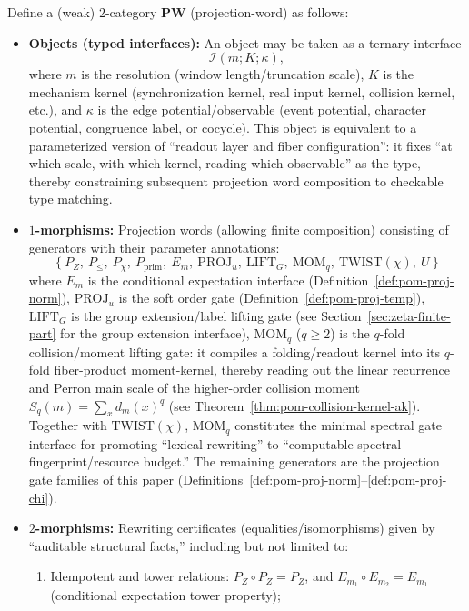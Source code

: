 \begin{definition}\label{def:pom-projword-2cat}
Define a (weak) $2$-category $\mathbf{PW}$ (projection-word) as follows:
\begin{itemize}
  \item \textbf{Objects (typed interfaces):} An object may be taken as a ternary interface
  \[
  \mathcal{I}(m;K;\kappa),
  \]
  where $m$ is the resolution (window length/truncation scale), $K$ is the mechanism kernel (synchronization kernel, real input kernel, collision kernel, etc.), and $\kappa$ is the edge potential/observable (event potential, character potential, congruence label, or cocycle). This object is equivalent to a parameterized version of ``readout layer and fiber configuration'': it fixes ``at which scale, with which kernel, reading which observable'' as the type, thereby constraining subsequent projection word composition to checkable type matching.
  \item \textbf{$1$-morphisms:} Projection words (allowing finite composition) consisting of generators with their parameter annotations:
  \[
  \{\ P_Z,\ P_{\le},\ P_\chi,\ P_{\mathrm{prim}},\ E_m,\ \mathrm{PROJ}_u,\ \mathrm{LIFT}_G,\ \mathrm{MOM}_q,\ \mathrm{TWIST}(\chi),\ U\ \}
  \]
  where $E_m$ is the conditional expectation interface (Definition~\ref{def:pom-proj-norm}), $\mathrm{PROJ}_u$ is the soft order gate (Definition~\ref{def:pom-proj-temp}), $\mathrm{LIFT}_G$ is the group extension/label lifting gate (see Section~\ref{sec:zeta-finite-part} for the group extension interface), $\mathrm{MOM}_q$ ($q\ge2$) is the $q$-fold collision/moment lifting gate: it compiles a folding/readout kernel into its $q$-fold fiber-product moment-kernel, thereby reading out the linear recurrence and Perron main scale of the higher-order collision moment \(S_q(m)=\sum_x d_m(x)^q\) (see Theorem~\ref{thm:pom-collision-kernel-ak}). Together with \(\mathrm{TWIST}(\chi)\), \(\mathrm{MOM}_q\) constitutes the minimal spectral gate interface for promoting ``lexical rewriting'' to ``computable spectral fingerprint/resource budget.'' The remaining generators are the projection gate families of this paper (Definitions~\ref{def:pom-proj-norm}--\ref{def:pom-proj-chi}).
  \item \textbf{$2$-morphisms:} Rewriting certificates (equalities/isomorphisms) given by ``auditable structural facts,'' including but not limited to:
  \begin{enumerate}
    \item Idempotent and tower relations: $P_Z\circ P_Z=P_Z$, and $E_{m_1}\circ E_{m_2}=E_{m_1}$ (conditional expectation tower property);

\end{enumerate}
\end{itemize}
\end{definition}
